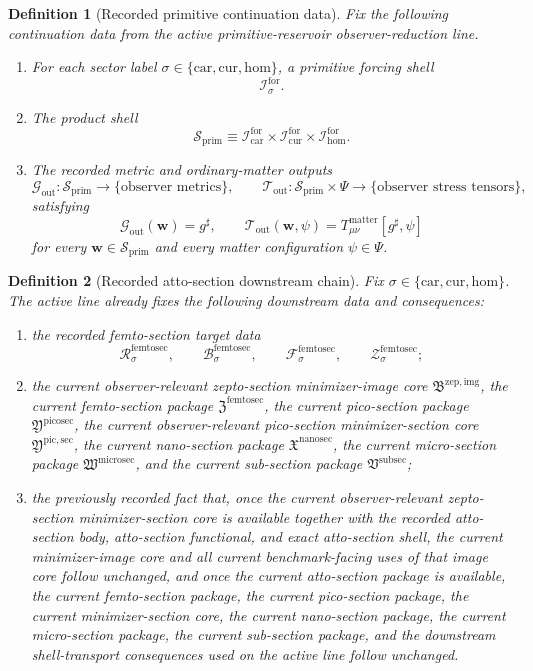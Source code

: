 \documentclass[11pt]{article}
\newcommand{\CompletedMetric}{g^{\sharp}}
\newcommand{\MatterSpace}{\Psi}
\newcommand{\Car}{\mathrm{car}}
\newcommand{\Cur}{\mathrm{cur}}
\newcommand{\Hom}{\mathrm{hom}}
\newcommand{\ForSpace}[1]{\mathcal I_{#1}^{\mathrm{for}}}
\newcommand{\PrimShell}{\mathcal S_{\mathrm{prim}}}
\newcommand{\MetricOut}{\mathscr G_{\mathrm{out}}}
\newcommand{\MatterOut}{\mathscr T_{\mathrm{out}}}
\newcommand{\SubSectionPackage}{\mathfrak V^{\mathrm{subsec}}}
\newcommand{\MicroSectionPackage}{\mathfrak W^{\mathrm{microsec}}}
\newcommand{\NanoSectionPackage}{\mathfrak X^{\mathrm{nanosec}}}
\newcommand{\PicoSectionPackage}{\mathfrak Y^{\mathrm{picosec}}}
\newcommand{\PicoMinSectionCore}{\mathfrak Y^{\mathrm{pic,sec}}}
\newcommand{\FemtoSectionPackage}{\mathfrak Z^{\mathrm{femtosec}}}
\newcommand{\FemtoSectionSpace}[1]{\mathcal R_{#1}^{\mathrm{femtosec}}}
\newcommand{\FemtoSectionBody}[1]{\mathcal B_{#1}^{\mathrm{femtosec}}}
\newcommand{\FemtoSectionFunctional}[1]{\mathscr F_{#1}^{\mathrm{femtosec}}}
\newcommand{\FemtoSectionShell}[1]{\mathcal Z_{#1}^{\mathrm{femtosec}}}
\newcommand{\ZeptoImageCore}{\mathfrak B^{\mathrm{zep,img}}}
\newtheorem{definition}{Definition}
\begin{document}
\begin{definition}[Recorded primitive continuation data]
\label{def:fixed}
Fix the following continuation data from the active primitive-reservoir observer-reduction line.
\begin{enumerate}
    \item For each sector label \(\sigma\in\{\Car,\Cur,\Hom\}\), a primitive forcing shell
    \[
    \ForSpace{\sigma}.
    \]
    \item The product shell
    \[
    \PrimShell
    \equiv
    \ForSpace{\Car}\times \ForSpace{\Cur}\times \ForSpace{\Hom}.
    \]
    \item The recorded metric and ordinary-matter outputs
    \[
    \MetricOut:\PrimShell\to\{\text{observer metrics}\},
    \qquad
    \MatterOut:\PrimShell\times\MatterSpace\to\{\text{observer stress tensors}\},
    \]
    satisfying
    \begin{equation}
    \MetricOut(\mathbf w)=\CompletedMetric,
    \qquad
    \MatterOut(\mathbf w,\psi)
    =
    T_{\mu\nu}^{\mathrm{matter}}[\CompletedMetric,\psi]
    \label{eq:fixedoutputs}
    \end{equation}
    for every \(\mathbf w\in\PrimShell\) and every matter configuration \(\psi\in\MatterSpace\).
\end{enumerate}
\end{definition}

\begin{definition}[Recorded atto-section downstream chain]
\label{def:downstream}
Fix \(\sigma\in\{\Car,\Cur,\Hom\}\). The active line already fixes the following downstream data and consequences:
\begin{enumerate}
    \item the recorded femto-section target data
    \[
    \FemtoSectionSpace{\sigma},\qquad
    \FemtoSectionBody{\sigma},\qquad
    \FemtoSectionFunctional{\sigma},\qquad
    \FemtoSectionShell{\sigma};
    \]
    \item the current observer-relevant zepto-section minimizer-image core \(\ZeptoImageCore\), the current femto-section package \(\FemtoSectionPackage\), the current pico-section package \(\PicoSectionPackage\), the current observer-relevant pico-section minimizer-section core \(\PicoMinSectionCore\), the current nano-section package \(\NanoSectionPackage\), the current micro-section package \(\MicroSectionPackage\), and the current sub-section package \(\SubSectionPackage\);
    \item the previously recorded fact that, once the current observer-relevant zepto-section minimizer-section core is available together with the recorded atto-section body, atto-section functional, and exact atto-section shell, the current minimizer-image core and all current benchmark-facing uses of that image core follow unchanged, and once the current atto-section package is available, the current femto-section package, the current pico-section package, the current minimizer-section core, the current nano-section package, the current micro-section package, the current sub-section package, and the downstream shell-transport consequences used on the active line follow unchanged.
\end{enumerate}
\end{definition}
\end{document}
